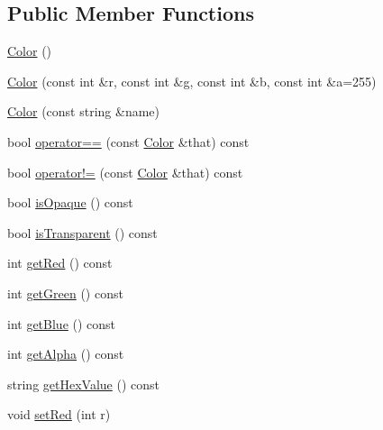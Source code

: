 \subsection*{Public Member Functions}
\begin{DoxyCompactItemize}
\item 
\mbox{\hyperlink{classbridges_1_1datastructure_1_1_color_ad6b8b6b89a54ebea80d211679e10be3e}{Color}} ()
\item 
\mbox{\hyperlink{classbridges_1_1datastructure_1_1_color_a0b746741c261fdc010adab62bbdb862c}{Color}} (const int \&r, const int \&g, const int \&b, const int \&a=255)
\item 
\mbox{\hyperlink{classbridges_1_1datastructure_1_1_color_a9db6443e24d6f946c085b2d8677d9c52}{Color}} (const string \&name)
\item 
bool \mbox{\hyperlink{classbridges_1_1datastructure_1_1_color_a43a31ca1f860081116197c9b29e4aa45}{operator==}} (const \mbox{\hyperlink{classbridges_1_1datastructure_1_1_color}{Color}} \&that) const
\item 
bool \mbox{\hyperlink{classbridges_1_1datastructure_1_1_color_aa3eb6797dc6d27681415569cf67d9196}{operator!=}} (const \mbox{\hyperlink{classbridges_1_1datastructure_1_1_color}{Color}} \&that) const
\item 
bool \mbox{\hyperlink{classbridges_1_1datastructure_1_1_color_acd9400b1b5f621e9147204e2bee5e29a}{is\+Opaque}} () const
\item 
bool \mbox{\hyperlink{classbridges_1_1datastructure_1_1_color_a82713b25585724ddcb73d3c209aaaad9}{is\+Transparent}} () const
\item 
int \mbox{\hyperlink{classbridges_1_1datastructure_1_1_color_a7460203f01e0437e7ce23d85bffdb7ed}{get\+Red}} () const
\item 
int \mbox{\hyperlink{classbridges_1_1datastructure_1_1_color_a4e97402d8321374a6d97327dad603341}{get\+Green}} () const
\item 
int \mbox{\hyperlink{classbridges_1_1datastructure_1_1_color_a07ea27d8745ddec7834fe9ec7fca4032}{get\+Blue}} () const
\item 
int \mbox{\hyperlink{classbridges_1_1datastructure_1_1_color_a07964b6c9fce8c3b4a3ba28169bf2103}{get\+Alpha}} () const
\item 
string \mbox{\hyperlink{classbridges_1_1datastructure_1_1_color_a494648d2940754828f2054f92de031dc}{get\+Hex\+Value}} () const
\item 
void \mbox{\hyperlink{classbridges_1_1datastructure_1_1_color_a487be07319fe83e9642cd0387ebed33a}{set\+Red}} (int r)

\end{DoxyCompactItemize}
